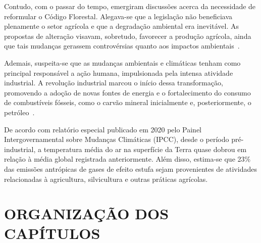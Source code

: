     Contudo, com o passar do tempo, emergiram discussões acerca da necessidade de reformular o Código Florestal. 
    Alegava-se que a legislação não beneficiava plenamente o setor agrícola e que a degradação ambiental era inevitável. 
    As propostas de alteração visavam, sobretudo, favorecer a produção agrícola, ainda que tais mudanças gerassem 
    controvérsias quanto aos impactos ambientais~\cite{Araujo_Boaventura_Silva2022}.
    
    Ademais, suspeita-se que as mudanças ambientais e climáticas tenham como principal responsável a ação humana, 
    impulsionada pela intensa atividade industrial. A revolução industrial marcou o início dessa transformação, 
    promovendo a adoção de novas fontes de energia e o fortalecimento do consumo de combustíveis fósseis, como o carvão 
    mineral inicialmente e, posteriormente, o petróleo~\cite{mendoncca2006aquecimento}.
    
    De acordo com relatório especial publicado em 2020 pelo Painel Intergovernamental sobre Mudanças Climáticas (IPCC), 
    desde o período pré-industrial, a temperatura média do ar na superfície da Terra quase dobrou em relação à média 
    global registrada anteriormente. Além disso, estima-se que 23\% das emissões antrópicas de gases de efeito estufa 
    sejam provenientes de atividades relacionadas à agricultura, silvicultura e outras práticas agrícolas.

\section{ORGANIZAÇÃO DOS CAPÍTULOS}
